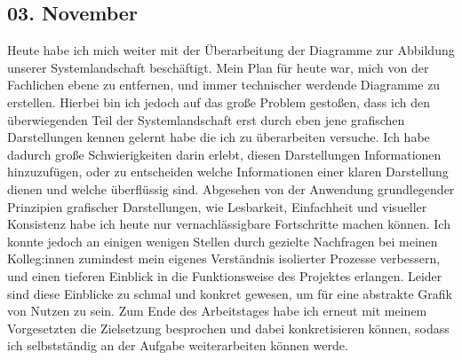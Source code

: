 \subsection{03. November}
Heute habe ich mich weiter mit der Überarbeitung der Diagramme zur Abbildung unserer Systemlandschaft beschäftigt. Mein Plan für heute war, mich von der Fachlichen ebene zu entfernen, und immer technischer werdende Diagramme zu erstellen. Hierbei bin ich jedoch auf das große Problem gestoßen, dass ich den überwiegenden Teil der Systemlandschaft erst durch eben jene grafischen Darstellungen kennen gelernt habe die ich zu überarbeiten versuche. Ich habe dadurch große Schwierigkeiten darin erlebt, diesen Darstellungen Informationen hinzuzufügen, oder zu entscheiden welche Informationen einer klaren Darstellung dienen und welche überflüssig sind. Abgesehen von der Anwendung grundlegender Prinzipien grafischer Darstellungen, wie Lesbarkeit, Einfachheit und visueller Konsistenz habe ich heute nur vernachlässigbare Fortschritte machen können. Ich konnte jedoch an einigen wenigen Stellen durch gezielte Nachfragen bei meinen Kolleg:innen zumindest mein eigenes Verständnis isolierter Prozesse verbessern, und einen tieferen Einblick in die Funktionsweise des Projektes erlangen. Leider sind diese Einblicke zu schmal und konkret gewesen, um für eine abstrakte Grafik von Nutzen zu sein. Zum Ende des Arbeitstages habe ich erneut mit meinem Vorgesetzten die Zielsetzung besprochen und dabei konkretisieren können, sodass ich selbstständig an der Aufgabe weiterarbeiten können werde.
